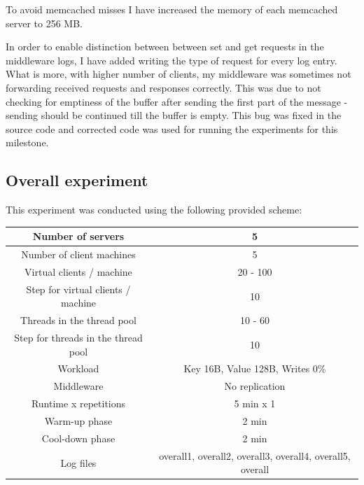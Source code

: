 \documentclass[11pt]{article}
\begin{document}
To avoid memcached misses I have increased the memory of each memcached server to 256 MB.

In order to enable distinction between between set and get requests in the middleware logs, I have added writing the type of request for every log entry. What is more, with higher number of clients, my middleware was sometimes not forwarding received requests and responses correctly. This was due to not checking for emptiness of the buffer after sending the first part of the message - sending should be continued till the buffer is empty. This bug was fixed in the source code and corrected code was used for running the experiments for this milestone. 

\subsection{Overall experiment}
This experiment was conducted using the following provided scheme:
\medskip

\small{
\smallskip
\begin{tabular}{|c|c|}
\hline Number of servers & 5 \\ 
\hline Number of client machines & 5 \\ 
\hline Virtual clients / machine & 20 - 100 \\ 
\hline Step for virtual clients / machine & 10 \\ 
\hline Threads in the thread pool & 10 - 60 \\
\hline Step for threads in the thread pool & 10 \\
\hline Workload & Key 16B, Value 128B, Writes 0\% \\
\hline Middleware & No replication \\ 
\hline Runtime x repetitions & 5 min x 1 \\ 
\hline Warm-up phase & 2 min \\
\hline Cool-down phase & 2 min \\

\hline Log files & overall1, overall2, overall3, overall4, overall5, overall \\
\hline 
\end{tabular} }
\medskip
\end{document}
